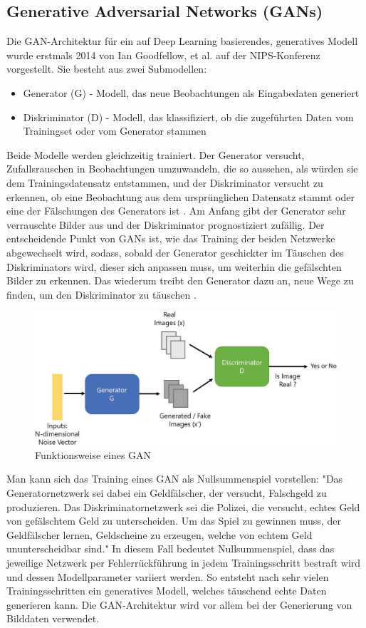 \subsection{Generative Adversarial Networks (GANs)}\label{Generative Adversarial Networks (GANs)}

Die GAN-Architektur für ein auf Deep Learning basierendes, generatives Modell wurde erstmals 2014 von Ian Goodfellow, et al. auf der NIPS-Konferenz vorgestellt. Sie besteht aus zwei Submodellen:
\begin{itemize}
    \item Generator (G) - Modell, das neue Beobachtungen als Eingabedaten generiert
    \item Diskriminator (D) - Modell, das klassifiziert, ob die zugeführten Daten vom Trainingset oder vom Generator stammen
\end{itemize}
Beide Modelle werden gleichzeitig trainiert. Der Generator versucht, Zufallsrauschen in Beobachtungen umzuwandeln, die so aussehen, als würden sie dem Trainingsdatensatz entstammen, und der Diskriminator versucht zu erkennen, ob eine Beobachtung aus dem ursprünglichen Datensatz stammt oder eine der Fälschungen des Generators ist \cite{bro19}. Am Anfang gibt der Generator sehr verrauschte Bilder aus und der Diskriminator prognostiziert zufällig. Der entscheidende Punkt von GANs ist, wie das Training der beiden Netzwerke abgewechselt wird, sodass, sobald der Generator geschickter im Täuschen des Diskriminators wird, dieser sich anpassen muss, um weiterhin die gefälschten Bilder zu erkennen. Das wiederum treibt den Generator dazu an, neue Wege zu finden, um den Diskriminator zu täuschen \cite[S.99]{fos19}.
\begin{figure}[H]
    \centering
    \includegraphics[width=1\textwidth,angle=0]{abb/Springer_GAN}
    \caption[Funktionsweise eines GAN]{Funktionsweise eines GAN \cite{SDT18}}
\end{figure}
Man kann sich das Training eines GAN als Nullsummenspiel vorstellen: "Das Generatornetzwerk sei dabei ein Geldfälscher, der versucht, Falschgeld zu produzieren. Das Diskriminatornetzwerk sei die Polizei, die versucht, echtes Geld von gefälschtem Geld zu unterscheiden. Um das Spiel zu gewinnen muss, der Geldfälscher lernen, Geldscheine zu erzeugen, welche von echtem Geld ununterscheidbar sind." \cite{goo16} In diesem Fall bedeutet Nullsummenspiel, dass das jeweilige Netzwerk per Fehlerrückführung in jedem Trainingsschritt bestraft wird und dessen Modellparameter variiert werden. So entsteht nach sehr vielen Trainingsschritten ein generatives Modell, welches täuschend echte Daten generieren kann. Die GAN-Architektur wird vor allem bei der Generierung von Bilddaten verwendet.

